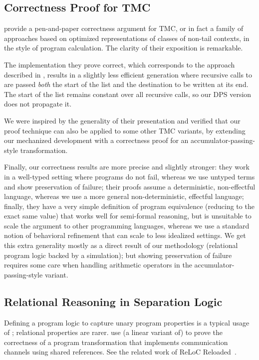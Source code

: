 \subsection{Correctness Proof for TMC}

\citet*{tmc-koka-2023} provide a pen-and-paper correctness argument for TMC, or in fact a family of approaches based on optimized representations of classes of non-tail contexts, in the style of program calculation.
The clarity of their exposition is remarkable.

The implementation they prove correct, which corresponds to the approach described in \citet*{minamide-98}, results in a slightly less efficient generation where recursive calls to  are passed \emph{both} the start of the list and the destination to be written at its end.
The start of the list remains constant over all recursive calls, so our DPS version does not propagate it.

We were inspired by the generality of their presentation and verified that our proof technique can also be applied to some other TMC variants, by extending our mechanized development with a correctness proof for an
accumulator-passing-style transformation.

Finally, our correctness results are more precise and slightly stronger: they work in a well-typed setting where programs do not fail, whereas we use untyped terms and show preservation of failure; their proofs assume a deterministic, non-effectful language, whereas we use a more general non-deterministic, effectful language; finally, they have a very simple definition of program equivalence (reducing to the exact same value) that works well for semi-formal reasoning, but is unsuitable to scale the argument to other programming languages, whereas we use a standard notion of behavioral refinement that can scale to less idealized settings.
%
We get this extra generality mostly as a direct result of our methodology (relational program logic backed by a simulation); but showing preservation of failure requires some care when handling arithmetic operators in the accumulator-passing-style variant.

\subsection{Relational Reasoning in Separation Logic}

Defining a program logic to capture unary program properties is a typical usage of \Iris; relational properties are rarer. \citet*{tassarotti-2017} use (a linear variant of) \Iris to prove the correctness of a program transformation that implements communication channels using shared references. See the related work of ReLoC Reloaded~\citep*{reloc-2021}.

